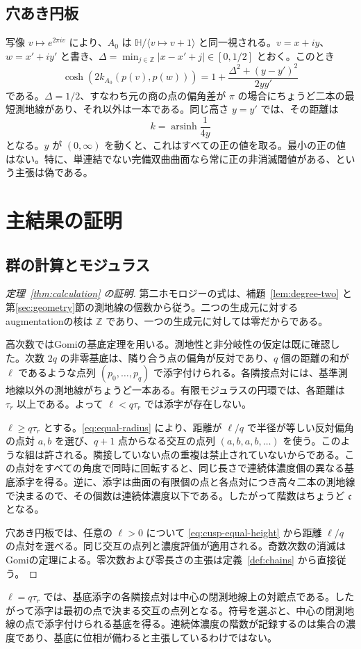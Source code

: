 \documentclass[12pt]{amsart}
\theoremstyle{definition}
\theoremstyle{remark}
\numberwithin{equation}{section}
\newcommand{\Z}{\mathbb{Z}}
\begin{document}
\subsection{穴あき円板}
写像 $v\mapsto e^{2\pi i v}$ により、$A_0$ は $\mathbb H/\langle v\mapsto v+1\rangle$ と同一視される。$v=x+iy$、$w=x'+iy'$ と書き、$\Delta=\min_{j\in\Z}|x-x'+j|\in[0,1/2]$ とおく。このとき
\begin{equation}\label{eq:cusp-distance}
 \cosh(2k_{A_0}(p(v),p(w)))=1+\frac{\Delta^2+(y-y')^2}{2yy'}
\end{equation}
である。$\Delta=1/2$、すなわち元の商の点の偏角差が $\pi$ の場合にちょうど二本の最短測地線があり、それ以外は一本である。同じ高さ $y=y'$ では、その距離は
\begin{equation}\label{eq:cusp-equal-height}
 k=\operatorname{arsinh}\frac1{4y}
\end{equation}
となる。$y$ が $(0,\infty)$ を動くと、これはすべての正の値を取る。最小の正の値はない。特に、単連結でない完備双曲曲面なら常に正の非消滅閾値がある、という主張は偽である。

\section{主結果の証明}\label{sec:proofs}
\subsection{群の計算とモジュラス}
\begin{proof}[定理~\ref{thm:calculation} の証明]
第二ホモロジーの式は、補題~\ref{lem:degree-two} と第\ref{sec:geometry}節の測地線の個数から従う。二つの生成元に対するaugmentationの核は $\Z$ であり、一つの生成元に対しては零だからである。

高次数ではGomiの基底定理を用いる。測地性と非分岐性の仮定は既に確認した。次数 $2q$ の非零基底は、隣り合う点の偏角が反対であり、$q$ 個の距離の和が $\ell$ であるような点列 $(p_0,\ldots,p_q)$ で添字付けられる。各隣接点対には、基準測地線以外の測地線がちょうど一本ある。有限モジュラスの円環では、各距離は $\tau_r$ 以上である。よって $\ell<q\tau_r$ では添字が存在しない。

$\ell\ge q\tau_r$ とする。\eqref{eq:equal-radius} により、距離が $\ell/q$ で半径が等しい反対偏角の点対 $a,b$ を選び、$q+1$ 点からなる交互の点列 $(a,b,a,b,\ldots)$ を使う。このような組は許される。隣接していない点の重複は禁止されていないからである。この点対をすべての角度で同時に回転すると、同じ長さで連続体濃度個の異なる基底添字を得る。逆に、添字は曲面の有限個の点と各点対につき高々二本の測地線で決まるので、その個数は連続体濃度以下である。したがって階数はちょうど $\mathfrak c$ となる。

穴あき円板では、任意の $\ell>0$ について \eqref{eq:cusp-equal-height} から距離 $\ell/q$ の点対を選べる。同じ交互の点列と濃度評価が適用される。奇数次数の消滅はGomiの定理による。零次数および零長さの主張は定義~\ref{def:chains} から直接従う。
\end{proof}
$\ell=q\tau_r$ では、基底添字の各隣接点対は中心の閉測地線上の対蹠点である。したがって添字は最初の点で決まる交互の点列となる。符号を選ぶと、中心の閉測地線の点で添字付けられる基底を得る。連続体濃度の階数が記録するのは集合の濃度であり、基底に位相が備わると主張しているわけではない。
\end{document}
